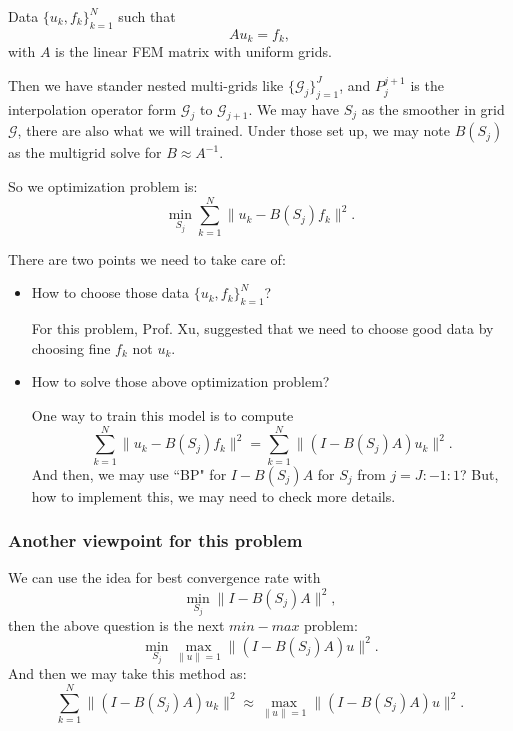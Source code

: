 Data $\{u_k, f_k\}_{k=1}^N$ such that 
\begin{equation}
A u_k = f_k,
\end{equation}
with $A$ is the linear FEM matrix with uniform grids. 

Then we have stander nested multi-grids like $\{\mathcal{G}_j \}_{j=1}^J$, and $P_{j}^{j+1}$ is the interpolation operator form $\mathcal{G}_j$ to $\mathcal{G}_{j+1}$. We may have $S_j$ as the smoother in grid $\mathcal{G}$, there are also what we will trained. Under those set up, we may note $B(S_j)$ as the multigrid solve for $B \approx A^{-1}$.

So we optimization problem is:
\begin{equation}
\min_{S_j} \sum_{k=1}^N\| u_k - B(S_j)f_k\|^2.
\end{equation}

There are two points we need to take care of:
\begin{itemize}
\item How to choose those data $\{u_k, f_k\}_{k=1}^N$?

For this problem, Prof. Xu, suggested that we need to choose good data by choosing fine $f_k$ not $u_k$. 

\item How to solve those above optimization problem?

One way to train this model is to compute 
\begin{equation}
\sum_{k=1}^N\| u_k - B(S_j)f_k\|^2 = \sum_{k=1}^N \| (I - B(S_j)A)u_k\|^2.
\end{equation}
And then, we may use ``BP" for $I - B(S_j)A$ for $S_j$ from $j = J: -1 :1$? But, how to implement this, we may need to check more details. 
\end{itemize}

\subsubsection{Another viewpoint for this problem}
We can use the idea for best convergence rate with 
\begin{equation}
\min_{S_j} \|I - B(S_j)A\|^2,
\end{equation}
then the above question is the next $min-max$ problem:
\begin{equation}
\min_{S_j} \max_{\|u\| = 1}\|(I - B(S_j)A)u\|^2.
\end{equation}
And then we may take this method as:
\begin{equation}
 \sum_{k=1}^N \| (I - B(S_j)A)u_k\|^2 \approx \max_{\|u\| = 1}\|(I - B(S_j)A)u\|^2.
\end{equation}





